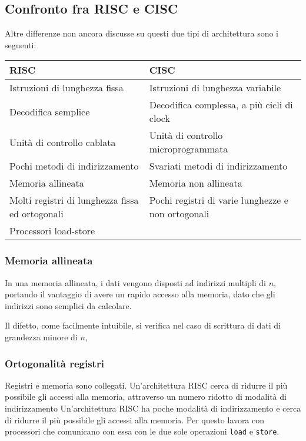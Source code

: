 \documentclass[../ace.tex]{subfiles}
\begin{document}
\newpage
\subsection{Confronto fra RISC e CISC}
Altre differenze non ancora discusse su questi due tipi di architettura sono i seguenti:

\begin{table}[h]
    \centering
    \begin{tabu}{|m{.4\textwidth}|m{.4\textwidth}|}
        \rowfont{\centering\bfseries\color{clr-primary}}
        \hline
        RISC & CISC \\
        \hline
        Istruzioni di lunghezza fissa & Istruzioni di lunghezza variabile\\
        \hline
        Decodifica semplice & Decodifica complessa, a più cicli di clock\\
        \hline
        Unità di controllo cablata & Unità di controllo microprogrammata\\
        \hline
        Pochi metodi di indirizzamento & Svariati metodi di indirizzamento\\
        \hline
        Memoria allineata & Memoria non allineata\\
        \hline
        Molti registri di lunghezza fissa ed ortogonali & Pochi registri di varie lunghezze e non ortogonali\\
        \hline
        Processori load-store&\\
        \hline
    \end{tabu}
\end{table}

\subsubsection{Memoria allineata}
In una memoria allineata, i dati vengono disposti ad indirizzi multipli di $n$, portando il vantaggio di avere un rapido accesso alla memoria, dato che gli indirizzi sono semplici da calcolare.

Il difetto, come facilmente intuibile, si verifica nel caso di scrittura di dati di grandezza minore di $n$,

\subsubsection{Ortogonalità registri}
Registri e memoria sono collegati.
Un'architettura RISC cerca di ridurre il più possibile gli accessi alla memoria, attraverso un numero ridotto di modalità di indirizzamento
Un'architettura RISC ha poche modalità di indirizzamento e cerca di ridurre il più possibile gli accessi alla memoria. Per questo lavora con processori che comunicano con essa con le due sole operazioni \lstinline{load} e \lstinline{store}.
\end{document}
